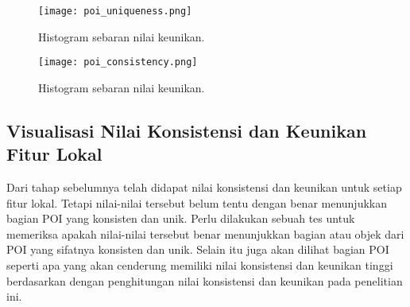 \begin{figure}[H]
	\centering
	\texttt{[image: poi\_uniqueness.png]}
	\caption{Histogram sebaran nilai keunikan.}
	\label{fig:uniqueness_gsv600}
\end{figure}

\begin{figure}[H]
	\centering
	\texttt{[image: poi\_consistency.png]}
	\caption{Histogram sebaran nilai keunikan.}
	\label{fig:consistency_gsv600}
\end{figure}

\subsection{Visualisasi Nilai Konsistensi dan Keunikan Fitur Lokal}
Dari tahap sebelumnya telah didapat nilai konsistensi dan keunikan untuk setiap fitur lokal. Tetapi nilai-nilai tersebut belum tentu dengan benar menunjukkan bagian POI yang konsisten dan unik. Perlu dilakukan sebuah tes untuk memeriksa apakah nilai-nilai tersebut benar menunjukkan bagian atau objek dari POI yang sifatnya konsisten dan unik. Selain itu juga akan dilihat bagian POI seperti apa yang akan cenderung memiliki nilai konsistensi dan keunikan tinggi berdasarkan dengan penghitungan nilai konsistensi dan keunikan pada penelitian ini.

